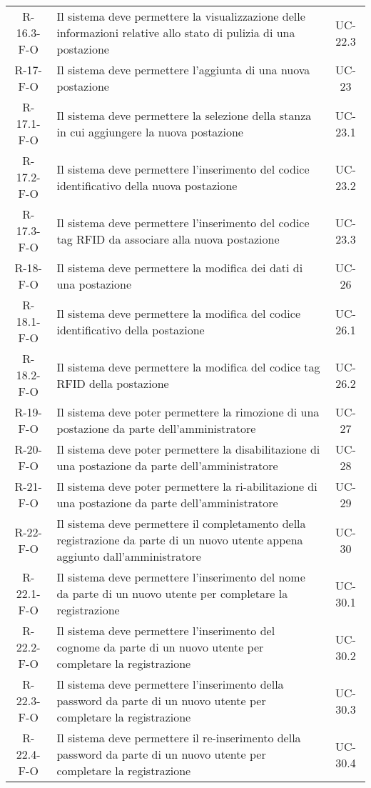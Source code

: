 \begin{longtable}{ c C{9cm} c }
    R-16.3-F-O & Il sistema deve permettere la visualizzazione delle informazioni relative allo stato di pulizia di una postazione & UC- 22.3\\
    R-17-F-O & Il sistema deve permettere l'aggiunta di una nuova postazione& UC- 23\\
    R-17.1-F-O & Il sistema deve permettere la selezione della stanza in cui aggiungere la nuova postazione& UC- 23.1\\
    R-17.2-F-O & Il sistema deve permettere l'inserimento del codice identificativo della nuova postazione& UC- 23.2\\
    R-17.3-F-O & Il sistema deve permettere l'inserimento del codice tag RFID da associare alla nuova postazione& UC- 23.3\\
    R-18-F-O & Il sistema deve permettere la modifica dei dati di una postazione& UC- 26\\
    R-18.1-F-O & Il sistema deve permettere la modifica del codice identificativo della postazione& UC- 26.1\\
    R-18.2-F-O & Il sistema deve permettere la modifica del codice tag RFID della postazione& UC- 26.2\\
    R-19-F-O &  Il sistema deve poter permettere la rimozione di una postazione da parte dell'amministratore& UC- 27\\
    R-20-F-O &  Il sistema deve poter permettere la disabilitazione di una postazione da parte dell'amministratore& UC- 28\\
    R-21-F-O &  Il sistema deve poter permettere la ri-abilitazione di una postazione da parte dell'amministratore& UC- 29\\
    R-22-F-O & Il sistema deve permettere il completamento della registrazione da parte di un nuovo utente appena aggiunto dall'amministratore& UC- 30\\
    R-22.1-F-O & Il sistema deve permettere l'inserimento del nome da parte di un nuovo utente per completare la registrazione& UC- 30.1\\
    R-22.2-F-O & Il sistema deve permettere l'inserimento del cognome da parte di un nuovo utente per completare la registrazione& UC- 30.2\\
    R-22.3-F-O & Il sistema deve permettere l'inserimento della password da parte di un nuovo utente per completare la registrazione& UC- 30.3\\
    R-22.4-F-O & Il sistema deve permettere il re-inserimento della password da parte di un nuovo utente per completare la registrazione& UC- 30.4\\

\end{longtable}
